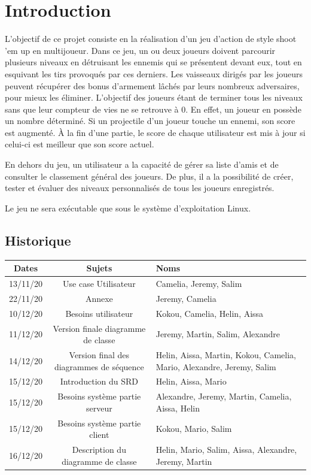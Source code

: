 \documentclass[a4paper,12pt]{article}
\begin{document}
\newpage

\tableofcontents

\newpage


\section{Introduction}

L’objectif de ce projet consiste en la réalisation d'un jeu d'action de style shoot 'em up en multijoueur. Dans ce jeu, un ou deux joueurs doivent parcourir plusieurs niveaux en détruisant les ennemis qui se présentent devant eux, tout en esquivant les tirs provoqués par ces derniers. Les vaisseaux dirigés par les joueurs peuvent récupérer des bonus d’armement lâchés par leurs nombreux adversaires, pour mieux les éliminer. L'objectif des joueurs étant de terminer tous les niveaux sans que leur compteur de vies ne se retrouve à 0. En effet, un joueur en possède un nombre déterminé. Si un projectile d'un joueur touche un ennemi, son score est augmenté. À la fin d'une partie, le score de chaque utilisateur est mis à jour si celui-ci est meilleur que son score actuel.

En dehors du jeu, un utilisateur a la capacité de gérer sa liste d'amis et de consulter le classement général des joueurs. De plus, il a la possibilité de créer, tester et évaluer des niveaux personnalisés de tous les joueurs enregistrés.

Le jeu ne sera exécutable que sous le système d'exploitation Linux.

\subsection{Historique}
\begin{tabularx}{16cm}{|c|c|X|}
	\hline
		Dates & Sujets & Noms \\
	\hline
		13/11/20 & Use case Utilisateur & Camelia, Jeremy, Salim \\
	\hline
		22/11/20 & Annexe & Jeremy, Camelia \\
	\hline
		10/12/20 & Besoins utilisateur & Kokou, Camelia, Helin, Aissa\\
	\hline
		11/12/20 & Version finale diagramme de classe  & Jeremy, Martin, Salim, Alexandre\\
	\hline
		14/12/20 & Version final des diagrammes de séquence & Helin, Aissa, Martin, Kokou, Camelia, 
		Mario, Alexandre, Jeremy, Salim\\
	\hline
		15/12/20 & Introduction du SRD & Helin, Aissa, Mario\\
	\hline
		15/12/20 & Besoins système partie serveur & Alexandre, Jeremy, Martin, Camelia, Aissa, Helin\\
	\hline
		15/12/20 & Besoins système partie client & Kokou, Mario, Salim\\
	\hline
		16/12/20 & Description du diagramme de classe & Helin, Mario, Salim, Aissa,
		Alexandre, Jeremy, Martin\\
	\hline
\end{tabularx}
\end{document}
